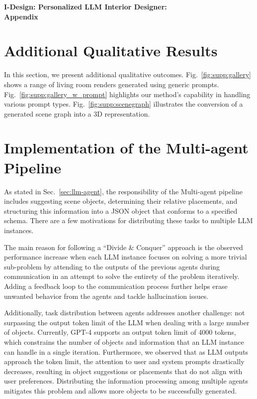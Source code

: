\begin{center}
\bfseries\Large
I-Design: Personalized LLM Interior Designer:\\
Appendix
\end{center}

\section{Additional Qualitative Results}
In this section, we present additional qualitative outcomes. Fig.~\ref{fig:supp:gallery} shows a range of living room renders generated using generic prompts. 
Fig.~\ref{fig:supp:gallery_w_prompt} highlights our method's capability in handling various prompt types. 
Fig.~\ref{fig:supp:scenegraph} illustrates the conversion of a generated scene graph into a 3D representation.






\section{Implementation of the Multi-agent Pipeline}
As stated in Sec.~\ref{sec:llm-agent}, the responsibility of the Multi-agent pipeline includes suggesting scene objects, determining their relative placements, and structuring this information into a JSON object that conforms to a specified schema. There are a few motivations for distributing these tasks to multiple LLM instances. 

The main reason for following a ``Divide \& Conquer'' approach is the observed performance increase when each LLM instance focuses on solving a more trivial sub-problem by attending to the outputs of the previous agents during communication in an attempt to solve the entirety of the problem iteratively. Adding a feedback loop to the communication process further helps erase unwanted behavior from the agents and tackle hallucination issues.

Additionally, task distribution between agents addresses another challenge: not surpassing the output token limit of the LLM when dealing with a large number of objects. Currently, GPT-4 supports an output token limit of 4000 tokens, which constrains the number of objects and information that an LLM instance can handle in a single iteration. Furthermore, we observed that as LLM outputs approach the token limit, the attention to user and system prompts drastically decreases, resulting in object suggestions or placements that do not align with user preferences. Distributing the information processing among multiple agents mitigates this problem and allows more objects to be successfully generated.

